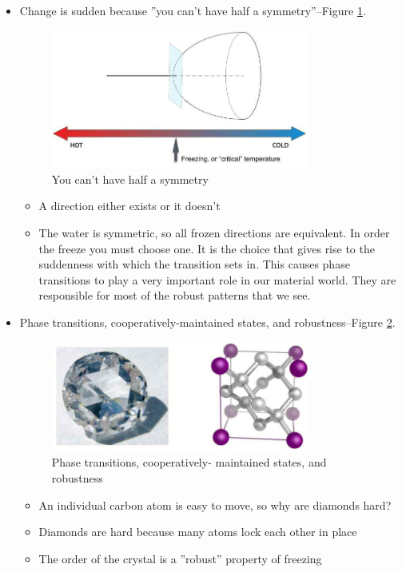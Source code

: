 \documentclass[]{article}
\begin{document}
\begin{itemize}
	\item Change is sudden because ''you can’t have half a symmetry''--Figure \ref{fig:water-ice3}.
	\begin{figure}[H]
		\begin{center}
			\caption{You can’t have half a symmetry}\label{fig:water-ice3}
			\includegraphics[width=0.8\textwidth]{water-ice3}
		\end{center}
	\end{figure}
	\begin{itemize}
		\item A direction either exists or it doesn’t
		\item The water is symmetric, so all frozen directions are equivalent. In order the freeze you must choose one. It is the choice that gives rise to the suddenness with which the transition sets in. This causes phase transitions to play a very important role in our material world. They are responsible for most of the robust patterns that we see.
	\end{itemize}
	\item Phase transitions, cooperatively-maintained states, and robustness--Figure \ref{fig:a-girls-best-friend}.
	\begin{figure}[H]
		\begin{center}
			\caption{Phase transitions, cooperatively-
				maintained states, and robustness}\label{fig:a-girls-best-friend}
			\includegraphics[width=0.8\textwidth]{a-girls-best-friend}
		\end{center}
	\end{figure}
	\begin{itemize}
		\item An individual carbon atom is easy to move, so why are diamonds hard?
		\item Diamonds are hard because many atoms lock each other in place
		\item The order of the crystal is a ''robust'' property of freezing
	\end{itemize}
\end{itemize}
\end{document}
